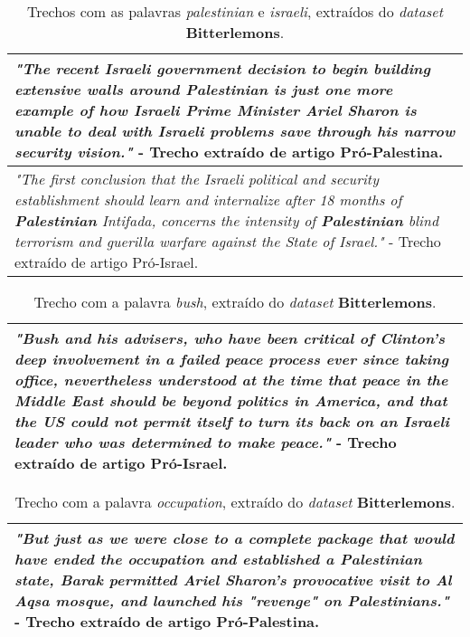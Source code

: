 \begin{table}[t]
\centering
\begin{tabular}{| p{10cm} | }
\hline

\emph{"The recent \textbf{Israeli} government decision to begin building extensive walls
around \textbf{Palestinian} is just one more example of how \textbf{Israeli} Prime
Minister Ariel Sharon is unable to deal with \textbf{Israeli} problems save
through his narrow security vision."} - Trecho extraído de artigo Pró-Palestina. \\ \hline

\emph{"The first conclusion that the Israeli political and security
establishment should learn and internalize after 18 months of
\textbf{Palestinian} Intifada, concerns the intensity of \textbf{Palestinian} blind
terrorism and guerilla warfare against the State of Israel."} - Trecho extraído de artigo Pró-Israel. \\ \hline

\end{tabular}
\label{3}
\caption{Trechos com as palavras \emph{palestinian} e \emph{israeli}, extraídos do \emph{dataset} \textbf{Bitterlemons}.}
\end{table}

\begin{table}[t]
\centering
\begin{tabular}{| p{10cm} | }
\hline

\emph{"\textbf{Bush}
and his advisers, who have been critical of Clinton's deep involvement
in a failed peace process ever since taking office, nevertheless
understood at the time that peace in the Middle East should be beyond
politics in America, and that the US could not permit itself to turn its
back on an Israeli leader who was determined to make peace."} - Trecho extraído de artigo Pró-Israel. \\ \hline

\end{tabular}
\label{4}
\caption{Trecho com a palavra \emph{bush}, extraído do \emph{dataset} \textbf{Bitterlemons}.}
\end{table}

\begin{table}[t]
\centering
\begin{tabular}{| p{10cm} | }
\hline
\emph{"But just as we were close to a complete
package that would have ended the \textbf{occupation} and established a
Palestinian state, Barak permitted Ariel Sharon's provocative visit to
Al Aqsa mosque, and launched his "revenge" on Palestinians."} - Trecho extraído de artigo Pró-Palestina. \\ \hline
\end{tabular}
\label{5}
\caption{Trecho com a palavra \emph{occupation}, extraído do \emph{dataset} \textbf{Bitterlemons}.}
\end{table}

